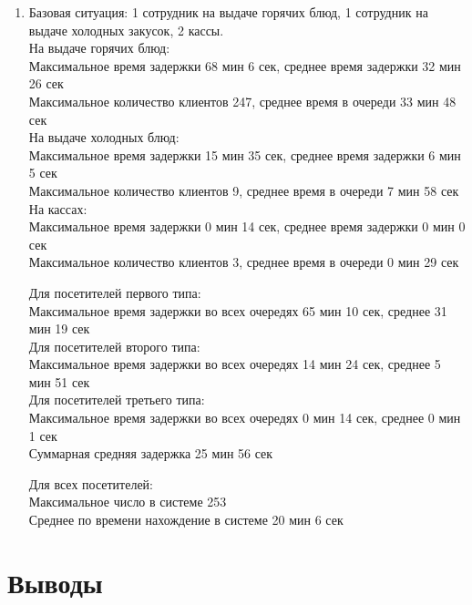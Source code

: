 \documentclass[12pt, a4paper, fleqn]{article}
\begin{document}
\begin{enumerate}
	\item Базовая ситуация: 1 сотрудник на выдаче горячих блюд, 1 сотрудник на выдаче холодных закусок, 2 кассы. \\
	
	\noindent На выдаче горячих блюд: \\
	Максимальное время задержки 68 мин 6 сек, среднее время задержки 32 мин 26 сек \\
	Максимальное количество клиентов 247, среднее время в очереди 33 мин 48 сек\\
	На выдаче холодных блюд: \\ 
	Максимальное время задержки 15 мин 35 сек, среднее время задержки 6 мин 5 сек \\
	Максимальное количество клиентов 9, среднее время в очереди 7 мин 58 сек \\
	На кассах: \\
	Максимальное время задержки 0 мин 14 сек, среднее время задержки 0 мин 0 сек \\
	Максимальное количество клиентов 3, среднее время в очереди 0 мин 29 сек

	Для посетителей первого типа: \\
	Максимальное время задержки во всех очередях 65 мин 10 сек, среднее 31 мин 19 сек \\
	Для посетителей второго типа: \\
	Максимальное время задержки во всех очередях 14 мин 24 сек, среднее 5 мин 51 сек \\
	Для посетителей третьего типа: \\
	Максимальное время задержки во всех очередях 0 мин 14 сек, среднее 0 мин 1 сек \\
	Суммарная средняя задержка 25 мин 56 сек

	Для всех посетителей: \\
	Максимальное число в системе 253 \\
	Среднее по времени нахождение в системе 20 мин 6 сек \\
\end{enumerate}

\section{Выводы}
\end{document}
